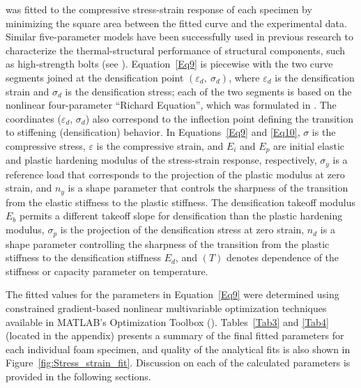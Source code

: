 \documentclass[review]{elsarticle}
\begin{document}
was fitted to the compressive stress-strain response of each specimen by minimizing the square area between the fitted curve and the experimental data. Similar five-parameter models have been successfully used in previous research to characterize the thermal-structural performance of structural components, such as high-strength bolts (see \cite{Wei2018}). Equation~\ref{Eq9} is piecewise with the two curve segments joined at the densification point $(\varepsilon_d,~\sigma_d)$, where $\varepsilon_d$ is the densification strain and $\sigma_d$ is the densification stress; each of the two segments is based on the nonlinear four-parameter ``Richard Equation'', which was formulated in \cite{Ric1975}. The coordinates ($\varepsilon_d$, $\sigma_d$) also correspond to the inflection point defining the transition to stiffening (densification) behavior. In Equations~\ref{Eq9} and \ref{Eq10}, $\sigma$ is the compressive stress, $\varepsilon$ is the compressive strain, and $E_i$ and $E_p$ are initial elastic and plastic hardening modulus of the stress-strain response, respectively, $\sigma_y$ is a reference load that corresponds to the projection of the plastic modulus at zero strain, and $n_y$ is a shape parameter that controls the sharpness of the transition from the elastic stiffness to the plastic stiffness. The densification takeoff modulus $E_b$ permits a different takeoff slope for densification than the plastic hardening modulus, $\sigma_p$ is the projection of the densification stress at zero strain, $n_d$ is a shape parameter controlling the sharpness of the transition from the plastic stiffness to the densification stiffness $E_d$, and $(T)$ denotes dependence of the stiffness or capacity parameter on temperature.

The fitted values for the parameters in Equation~\ref{Eq9} were determined using constrained gradient-based nonlinear multivariable optimization techniques available in MATLAB's Optimization Toolbox (\cite{Mat}). Tables~\ref{Tab3} and \ref{Tab4} (located in the appendix) presents a summary of the final fitted parameters for each individual foam specimen, and quality of the analytical fits is also shown in Figure~\ref{fig:Stress_strain_fit}. Discussion on each of the calculated parameters is provided in the following sections.
\end{document}
